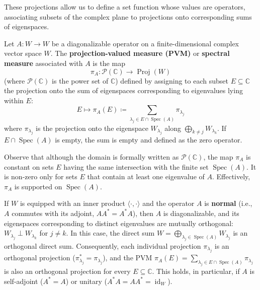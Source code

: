 These projections allow us to define a set function whose values are operators, associating subsets of the complex plane to projections onto corresponding sums of eigenspaces.

\begin{definition}
\label{def:pvm_finite}
Let $A: W \to W$ be a diagonalizable operator on a finite-dimensional complex vector space $W$. The \textbf{projection-valued measure (PVM)} or \textbf{spectral measure} associated with $A$ is the map
\begin{equation} \label{eq:4.14}
\pi_A : \mathcal{P}(\mathbb{C}) \longrightarrow \operatorname{Proj}(W)
\end{equation}
(where $\mathcal{P}(\mathbb{C})$ is the power set of $\mathbb{C}$) defined by assigning to each subset $E \subseteq \mathbb{C}$ the projection onto the sum of eigenspaces corresponding to eigenvalues lying within $E$:
\[ E \mapsto \pi_A(E) \coloneqq \sum_{\lambda_j \in E \cap \operatorname{Spec}(A)} \pi_{\lambda_j} \]
where $\pi_{\lambda_j}$ is the projection onto the eigenspace $W_{\lambda_j}$ along $\bigoplus_{k \neq j} W_{\lambda_k}$. If $E \cap \operatorname{Spec}(A)$ is empty, the sum is empty and defined as the zero operator.
\end{definition}

\begin{remark}
Observe that although the domain is formally written as $\mathcal{P}(\mathbb{C})$, the map $\pi_A$ is constant on sets $E$ having the same intersection with the finite set $\operatorname{Spec}(A)$. It is non-zero only for sets $E$ that contain at least one eigenvalue of $A$. Effectively, $\pi_A$ is supported on $\operatorname{Spec}(A)$.
\end{remark}

\begin{remark}
\label{rem:pvm_normal}
If $W$ is equipped with an inner product $\langle \cdot, \cdot \rangle$ and the operator $A$ is \textbf{normal} (i.e., $A$ commutes with its adjoint, $AA^* = A^*A$), then $A$ is diagonalizable, and its eigenspaces corresponding to distinct eigenvalues are mutually orthogonal: $W_{\lambda_j} \perp W_{\lambda_k}$ for $j \neq k$. In this case, the direct sum $W = \bigoplus_{\lambda_j \in \operatorname{Spec}(A)} W_{\lambda_j}$ is an orthogonal direct sum. Consequently, each individual projection $\pi_{\lambda_j}$ is an orthogonal projection ($\pi_{\lambda_j}^* = \pi_{\lambda_j}$), and the PVM $\pi_A(E) = \sum_{\lambda_j \in E \cap \operatorname{Spec}(A)} \pi_{\lambda_j}$ is also an orthogonal projection for every $E \subseteq \mathbb{C}$. This holds, in particular, if $A$ is self-adjoint ($A^*=A$) or unitary ($A^*A = AA^* = \operatorname{id}_W$).
\end{remark}

